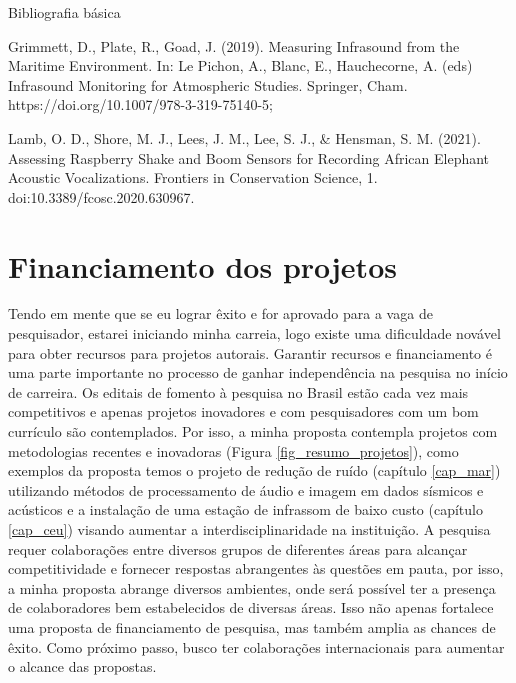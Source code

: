 \documentclass[10pt,a4paper,oneside]{book}
\begin{document}
\begin{fancyenum}{\faBook}{Bibliografia básica}
	\item Grimmett, D., Plate, R., Goad, J. (2019). Measuring Infrasound from the Maritime Environment. In: Le Pichon, A., Blanc, E., Hauchecorne, A. (eds) Infrasound Monitoring for Atmospheric Studies. Springer, Cham. https://doi.org/10.1007/978-3-319-75140-5;
	\item Lamb, O. D., Shore, M. J., Lees, J. M., Lee, S. J., \& Hensman, S. M. (2021). Assessing Raspberry Shake and Boom Sensors for Recording African Elephant Acoustic Vocalizations. Frontiers in Conservation Science, 1. doi:10.3389/fcosc.2020.630967.
\end{fancyenum}


\chapter{Financiamento dos projetos}
\label{cap_financiamento}

Tendo em mente que se eu lograr êxito e for aprovado para a vaga de pesquisador, estarei iniciando minha carreia, logo existe uma dificuldade novável para obter recursos para projetos autorais. Garantir recursos e financiamento é uma parte importante no processo de ganhar independência na pesquisa no início de carreira. Os editais de fomento à pesquisa no Brasil estão cada vez mais competitivos e apenas projetos inovadores e com pesquisadores com um bom currículo são contemplados. Por isso, a minha proposta contempla projetos com metodologias recentes e inovadoras (Figura \ref{fig_resumo_projetos}), como exemplos da proposta temos o projeto de redução de ruído (capítulo \ref{cap_mar}) utilizando métodos de processamento de áudio e imagem em dados sísmicos e acústicos e a instalação de uma estação de infrassom de baixo custo (capítulo \ref{cap_ceu}) visando aumentar a interdisciplinaridade na instituição. A pesquisa requer colaborações entre diversos grupos de diferentes áreas para alcançar competitividade e fornecer respostas abrangentes às questões em pauta, por isso, a minha proposta abrange diversos ambientes, onde será possível ter a presença de colaboradores bem estabelecidos de diversas áreas. Isso não apenas fortalece uma proposta de financiamento de pesquisa, mas também amplia as chances de êxito. Como próximo passo, busco ter colaborações internacionais para aumentar o alcance das propostas.
\end{document}
